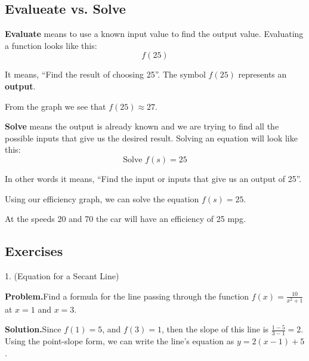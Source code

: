 \documentclass[10pt,]{book}
\newcommand{\terminology}[1]{\textbf{#1}}
\theoremstyle{plain}
\theoremstyle{definition}
\begin{document}
\subsection[Evalueate vs. Solve]{Evalueate vs. Solve}\label{subsection-3}
\terminology{Evaluate} means to use a known input value to find the output value. Evaluating a function looks like this:%
\[f(25)\]\par
It means, ``Find the result of choosing \SI{25}{\mileperhour}''. The symbol \(f(25)\) represents an \terminology{output}.%
\par
From the graph we see that \(f(25)\approx27\).%
\par
\terminology{Solve} means the output is already known and we are trying to find all the possible inputs that give us the desired result. Solving an equation will look like this:%
\[\text{Solve }f(s)=25\]\par
In other words it means, ``Find the input or inputs that give us an output of 25''.%
\par
Using our efficiency graph, we can solve the equation \(f(s)=25\).%
\par
At the speeds \SI{20}{\mileperhour} and \SI{70}{\mileperhour} the car will have an efficiency of 25 mpg.%
\typeout{************************************************}
\typeout{************************************************}
\subsection[Exercises]{Exercises}\label{exercises-1}
\begin{exerciselist}
\item[1.]\hypertarget{exercise-1}{}(Equation for a Secant Line)\space\space{}\par
\noindent%
\textbf{Problem.}\quad Find a formula for the line passing through the function \(f(x) = \frac{10}{x^2+1}\)  at \(x = 1\) and \(x = 3\).%
\par
 \framebox[20em]{\raisebox{1ex}{}}%
\par
\noindent%
\textbf{Solution.}\quad Since \(f(1) = 5\), and \(f(3) = 1\), then the slope of this line is \(\frac{1 - 5}{3 - 1}=2\). Using the point-slope form, we can write the line's equation as \(y=2(x-1)+5\).%
\par
\end{exerciselist}
\typeout{************************************************}
\typeout{************************************************}
\end{document}
